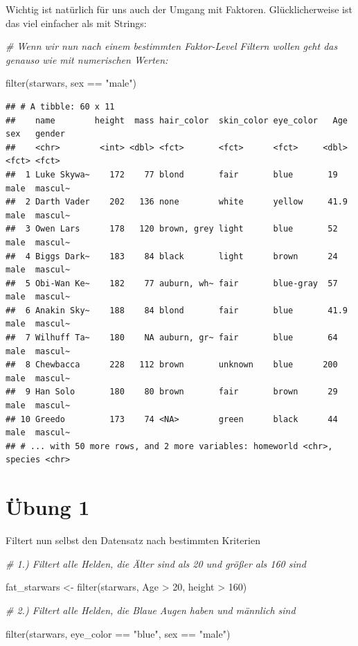 \documentclass[
]{book}
\newenvironment{Shaded}{\begin{snugshade}}{\end{snugshade}}
\newcommand{\CommentTok}[1]{\textcolor[rgb]{0.56,0.35,0.01}{\textit{#1}}}
\newcommand{\DecValTok}[1]{\textcolor[rgb]{0.00,0.00,0.81}{#1}}
\newcommand{\FunctionTok}[1]{\textcolor[rgb]{0.00,0.00,0.00}{#1}}
\newcommand{\NormalTok}[1]{#1}
\newcommand{\OtherTok}[1]{\textcolor[rgb]{0.56,0.35,0.01}{#1}}
\newcommand{\SpecialCharTok}[1]{\textcolor[rgb]{0.00,0.00,0.00}{#1}}
\newcommand{\StringTok}[1]{\textcolor[rgb]{0.31,0.60,0.02}{#1}}
\theoremstyle{definition}
\theoremstyle{definition}
\theoremstyle{definition}
\theoremstyle{definition}
\theoremstyle{remark}
\begin{document}
Wichtig ist natürlich für uns auch der Umgang mit Faktoren. Glücklicherweise ist das viel einfacher als mit Strings:

\begin{Shaded}
\begin{Highlighting}[]
\CommentTok{\# Wenn wir nun nach einem bestimmten Faktor{-}Level Filtern wollen geht das genauso wie mit numerischen Werten:}

\FunctionTok{filter}\NormalTok{(starwars, sex }\SpecialCharTok{==} \StringTok{"male"}\NormalTok{)}
\end{Highlighting}
\end{Shaded}

\begin{verbatim}
## # A tibble: 60 x 11
##    name        height  mass hair_color  skin_color eye_color   Age sex   gender 
##    <chr>        <int> <dbl> <fct>       <fct>      <fct>     <dbl> <fct> <fct>  
##  1 Luke Skywa~    172    77 blond       fair       blue       19   male  mascul~
##  2 Darth Vader    202   136 none        white      yellow     41.9 male  mascul~
##  3 Owen Lars      178   120 brown, grey light      blue       52   male  mascul~
##  4 Biggs Dark~    183    84 black       light      brown      24   male  mascul~
##  5 Obi-Wan Ke~    182    77 auburn, wh~ fair       blue-gray  57   male  mascul~
##  6 Anakin Sky~    188    84 blond       fair       blue       41.9 male  mascul~
##  7 Wilhuff Ta~    180    NA auburn, gr~ fair       blue       64   male  mascul~
##  8 Chewbacca      228   112 brown       unknown    blue      200   male  mascul~
##  9 Han Solo       180    80 brown       fair       brown      29   male  mascul~
## 10 Greedo         173    74 <NA>        green      black      44   male  mascul~
## # ... with 50 more rows, and 2 more variables: homeworld <chr>, species <chr>
\end{verbatim}

\hypertarget{uxfcbung-1}{%
\section{Übung 1}\label{uxfcbung-1}}

Filtert nun selbst den Datensatz nach bestimmten Kriterien

\begin{Shaded}
\begin{Highlighting}[]
\CommentTok{\# 1.) Filtert alle Helden, die Älter sind als 20 und größer als 160 sind}

\NormalTok{fat\_starwars }\OtherTok{\textless{}{-}} \FunctionTok{filter}\NormalTok{(starwars, Age }\SpecialCharTok{\textgreater{}} \DecValTok{20}\NormalTok{, height }\SpecialCharTok{\textgreater{}} \DecValTok{160}\NormalTok{)}

\CommentTok{\# 2.) Filtert alle Helden, die Blaue Augen haben und männlich sind}

\FunctionTok{filter}\NormalTok{(starwars, eye\_color }\SpecialCharTok{==} \StringTok{"blue"}\NormalTok{, sex }\SpecialCharTok{==} \StringTok{"male"}\NormalTok{)}
\end{Highlighting}
\end{Shaded}
\end{document}
